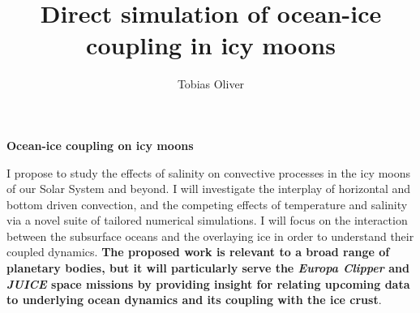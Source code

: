 \documentclass[12pt]{article}
\title{Direct simulation of ocean-ice coupling in icy moons}
\author{Tobias Oliver}
\date{}
\begin{document}
\pagestyle{fancy}
\thispagestyle{fancy}
\fancyhf{} %
\fancyhead[L]{\textcolor{red}{Tobias Oliver\\
Research Proposal}}
\fancyfoot[R]{\thepage}
\newcommand{\citep}[1]{\cite{#1}}
\begin{center}
\large{\textbf{Ocean-ice coupling on icy moons}}
\end{center}

I propose to study the effects of salinity on convective processes in the icy moons of our Solar System and beyond. 
I will investigate the interplay of horizontal and bottom driven convection, and the competing effects of temperature and salinity via a novel suite of tailored numerical simulations. 
I will focus on the interaction between the subsurface oceans and the overlaying ice in order to understand their coupled dynamics. 
\textbf{The proposed work is relevant to a broad range of planetary bodies, but it will particularly serve the \textit{Europa Clipper} and \textit{JUICE} space missions by providing insight for relating upcoming data to underlying ocean dynamics and its coupling with the ice crust}.
\end{document}
